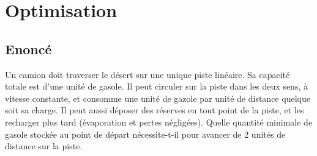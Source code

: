 \documentclass{article}
\newenvironment{statement}{\subsection{Enoncé}}{\pagebreak}
\begin{document}
\section{Optimisation}
\begin{statement}
Un camion doit traverser le désert sur une unique piste linéaire. Sa capacité totale est d'une unité de gasole. Il peut circuler sur la piste dans les deux sens, à vitesse constante, et consomme une unité de gazole par unité de distance quelque soit sa charge. Il peut aussi déposer des réserves en tout point de la piste, et les recharger plus tard (évaporation et pertes négligées). Quelle quantité minimale de gasole stockée au point de départ nécessite-t-il pour avancer de 2 unités de distance sur la piste.
\end{statement}
\end{document}
